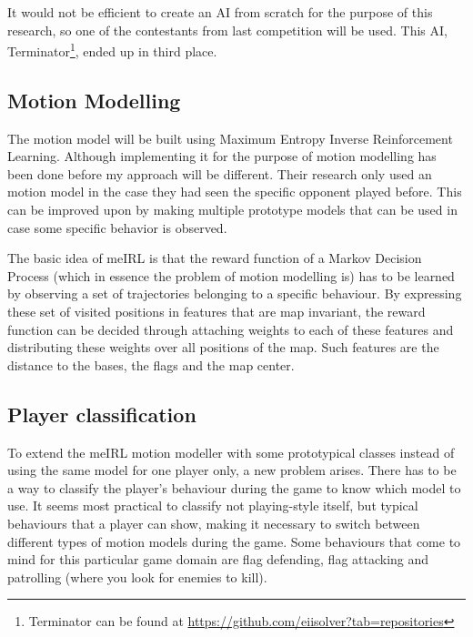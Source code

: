 \documentclass[a4paper, 12pt]{article}
\begin{document}
It would not be efficient to create an AI from scratch for the purpose of
this research, so one of the contestants from last competition will be
used. This AI, Terminator\footnote{Terminator can be found at
\url{https://github.com/eiisolver?tab=repositories}}, ended up in third place.

\subsection{Motion Modelling}
The motion model will be built using Maximum Entropy Inverse Reinforcement
Learning. Although implementing it for the purpose of motion modelling has been done before
\citep{6374144} my approach will be different. Their research
only used an motion model in the case they had seen the specific
opponent played before. This can be improved upon by making multiple prototype
models that can be used in case some specific behavior is observed. 

The basic idea of meIRL is that the reward function of a Markov Decision Process
(which in essence the problem of motion modelling is) has to be learned by
observing a set of trajectories belonging to a specific behaviour. 
By expressing these set of visited positions in
features that are map invariant, the reward function can be decided through
attaching weights to each of these features and distributing these weights over
all positions of the map. Such features are the distance to the bases, the flags
and the map center.

\subsection{Player classification}
To extend the meIRL motion modeller with some prototypical classes instead of
using the same model for one player only, a new problem arises. There has to be
a way to classify the player's behaviour during the game to know which model to
use. It seems most practical to classify not playing-style itself, but typical
behaviours that a player can show, making it necessary to switch
between different types of motion models during the game.
Some behaviours that come to mind for this particular game domain are flag
defending, flag attacking and patrolling (where you look for enemies to kill).
\end{document}
